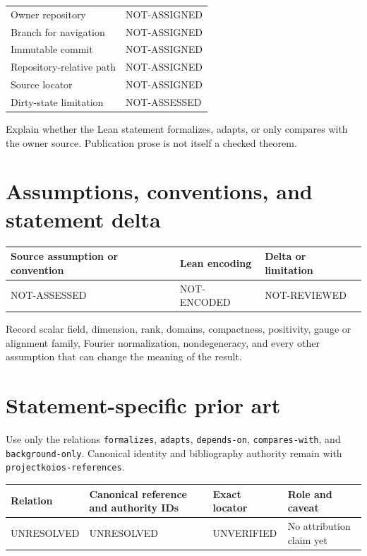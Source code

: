 \documentclass[11pt]{article}
\begin{document}
\begin{tabularx}{\textwidth}{@{}lX@{}}
\toprule
Owner repository & NOT-ASSIGNED \\
Branch for navigation & NOT-ASSIGNED \\
Immutable commit & NOT-ASSIGNED \\
Repository-relative path & NOT-ASSIGNED \\
Source locator & NOT-ASSIGNED \\
Dirty-state limitation & NOT-ASSESSED \\
\bottomrule
\end{tabularx}

Explain whether the Lean statement formalizes, adapts, or only compares with the owner
source. Publication prose is not itself a checked theorem.

\section{Assumptions, conventions, and statement delta}

\begin{tabularx}{\textwidth}{@{}XXX@{}}
\toprule
Source assumption or convention & Lean encoding & Delta or limitation \\
\midrule
NOT-ASSESSED & NOT-ENCODED & NOT-REVIEWED \\
\bottomrule
\end{tabularx}

Record scalar field, dimension, rank, domains, compactness, positivity, gauge or
alignment family, Fourier normalization, nondegeneracy, and every other assumption
that can change the meaning of the result.

\section{Statement-specific prior art}

Use only the relations \texttt{formalizes}, \texttt{adapts},
\texttt{depends-on}, \texttt{compares-with}, and \texttt{background-only}.
Canonical identity and bibliography authority remain with
\texttt{projectkoios-references}.

\begin{tabular}{@{}>{\raggedright\arraybackslash}p{}>{\raggedright\arraybackslash}p{}>{\raggedright\arraybackslash}p{}>{\raggedright\arraybackslash}p{}@{}}
\toprule
Relation & Canonical reference and authority IDs & Exact locator & Role and caveat \\
\midrule
UNRESOLVED & UNRESOLVED & UNVERIFIED & No attribution claim yet \\
\bottomrule
\end{tabular}
\end{document}
